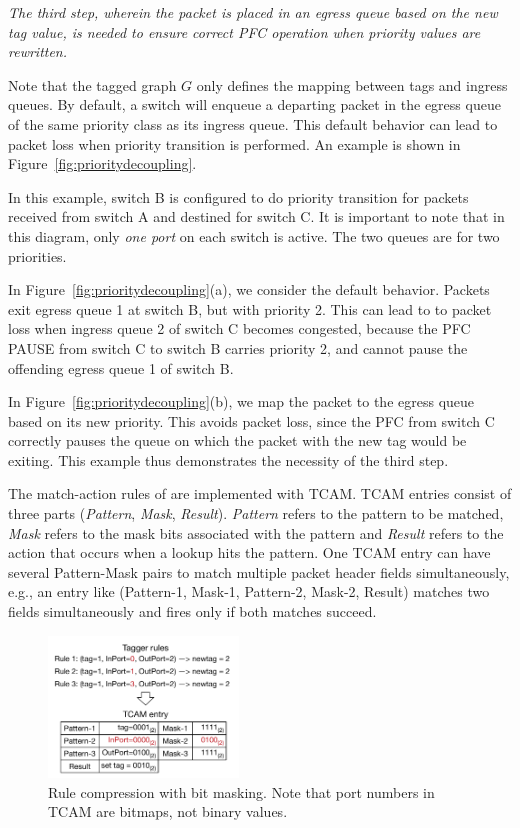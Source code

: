 {\em The third step, wherein the packet is placed in an egress queue based on the
{\em new} tag value, is needed to ensure correct PFC operation when priority
values are rewritten.}

Note that the tagged graph $G$ only defines the mapping between tags and ingress
queues. By default, a switch will enqueue a departing packet in the egress queue
of the same priority class as its ingress queue. This default behavior can lead
to packet loss when priority transition is performed. An example is shown in
Figure~\ref{fig:prioritydecoupling}.

In this example, switch B is configured to do priority transition for packets
received from switch A and destined for switch C. It is important to note that
in this diagram, only {\em one port} on each switch is active. The two queues
are for two priorities.

In Figure~\ref{fig:prioritydecoupling}(a), we consider the default behavior.
Packets exit egress queue 1 at switch B, but with priority 2.  This can lead to
to packet loss when ingress queue 2 of switch C becomes congested, because
the PFC PAUSE from switch C to switch B carries priority 2, and cannot pause
the offending egress queue 1 of switch B.

In Figure~\ref{fig:prioritydecoupling}(b), we map the packet to the egress queue
based on its new priority.  This avoids packet loss, since the PFC from switch C
correctly pauses the queue on which the packet with the new tag would be
exiting. This example thus demonstrates the necessity of the third step.

  The match-action rules of \sysname{}
are implemented with TCAM. TCAM entries consist of three parts ({\em Pattern},
{\em Mask}, {\em Result}). {\em Pattern} refers to the pattern to be matched, {\em
Mask} refers to the mask bits associated with the pattern and {\em Result}
refers to the action that occurs when a lookup hits the pattern.  One TCAM entry
can have several Pattern-Mask pairs to match multiple packet header fields
simultaneously, e.g., an entry like (Pattern-1, Mask-1, Pattern-2, Mask-2, Result)
matches two fields simultaneously and fires only if both matches succeed.

\begin{figure}
	\centering
	\includegraphics[width=0.45\textwidth] {figs/compression_with_bitmasking}
	\vspace{-1em}
	\caption{Rule compression with bit masking. Note that port numbers in TCAM are bitmaps, not binary values.}\label{fig:compression}
    \vspace{-1em}	
\end{figure}

